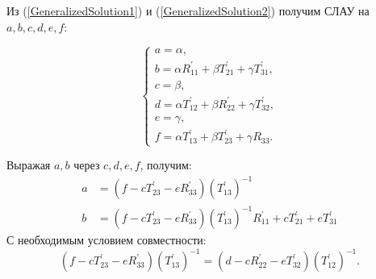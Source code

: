 \documentclass[a4 paper, 12 pt]{extarticle}
\begin{document}
   Из (\ref{GeneralizedSolution1}) и (\ref{GeneralizedSolution2}) получим СЛАУ на $a, b, c, d, e, f$:
   
   \[
   \begin{cases}
   a = \alpha, \\
   b = \alpha R_{11}^\prime  + \beta T_{21}^\prime  + \gamma T_{31}^\prime , \\
   c = \beta, \\
   d = \alpha T_{12}^\prime  + \beta R_{22}^\prime  + \gamma T_{32}^\prime , \\
   e = \gamma, \\
   f = \alpha T_{13}^\prime  + \beta T_{23}^\prime  + \gamma R_{33}.
   \end{cases}
   \]
   
   Выражая $a, b$ через $c, d, e, f$, получим:
   \[
   \begin{aligned}
   a &= \left(f - cT_{23}^\prime  - eR_{33}^\prime \right)\left(T_{13}^\prime\right)^{-1} \\
   b &= \left(f - cT_{23}^\prime  - eR_{33}^\prime \right)\left(T_{13}^\prime\right)^{-1}R_{11}^\prime + cT_{21}^\prime + eT_{31}^\prime
   \end{aligned}
   \]
   С необходимым условием совместности:
   \begin{equation}
   \label{compabilityConditionGeneralized}
   \left(f - cT_{23}^\prime - eR_{33}^\prime\right)\left(T_{13}^\prime\right)^{-1} = \left(d - cR_{22}^\prime - eT_{32}^\prime\right)\left(T_{12}^\prime\right)^{-1}.
   \end{equation}
   
\end{document}
